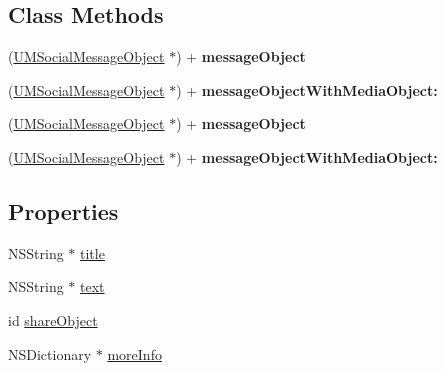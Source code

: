 \subsection*{Class Methods}
\begin{DoxyCompactItemize}
\item 
\mbox{\label{interface_u_m_social_message_object_aece046f59cc503e0f8d3177a309f7655}} 
(\mbox{\hyperlink{interface_u_m_social_message_object}{U\+M\+Social\+Message\+Object}} $\ast$) + {\bfseries message\+Object}
\item 
\mbox{\label{interface_u_m_social_message_object_ad36e5cb2591b5fc8b04d8f097dae57c7}} 
(\mbox{\hyperlink{interface_u_m_social_message_object}{U\+M\+Social\+Message\+Object}} $\ast$) + {\bfseries message\+Object\+With\+Media\+Object\+:}
\item 
\mbox{\label{interface_u_m_social_message_object_aece046f59cc503e0f8d3177a309f7655}} 
(\mbox{\hyperlink{interface_u_m_social_message_object}{U\+M\+Social\+Message\+Object}} $\ast$) + {\bfseries message\+Object}
\item 
\mbox{\label{interface_u_m_social_message_object_ad36e5cb2591b5fc8b04d8f097dae57c7}} 
(\mbox{\hyperlink{interface_u_m_social_message_object}{U\+M\+Social\+Message\+Object}} $\ast$) + {\bfseries message\+Object\+With\+Media\+Object\+:}
\end{DoxyCompactItemize}
\subsection*{Properties}
\begin{DoxyCompactItemize}
\item 
N\+S\+String $\ast$ \mbox{\hyperlink{interface_u_m_social_message_object_ae3dfb1104f916cef547f536c9b94d9cb}{title}}
\item 
N\+S\+String $\ast$ \mbox{\hyperlink{interface_u_m_social_message_object_a744ff849237891859874838ebade0218}{text}}
\item 
id \mbox{\hyperlink{interface_u_m_social_message_object_a13c183cd23b31b7604cfc118a0a3f4d0}{share\+Object}}
\item 
N\+S\+Dictionary $\ast$ \mbox{\hyperlink{interface_u_m_social_message_object_a72ab41a88a37eba5aa2e9e28e9da2510}{more\+Info}}
\end{DoxyCompactItemize}


